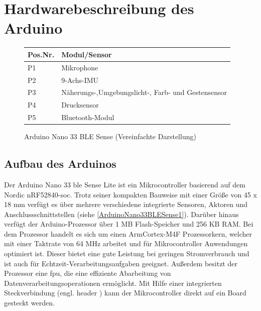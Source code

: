 %
%
%

\chapter{Hardwarebeschreibung des Arduino}
\begin{figure}[htb]
		\caption{Arduino Nano 33 BLE Sense (Vereinfachte Darstellung)} \label{ArduinoNano33BLESense1}
		\begin{tabularx}{\textwidth}{|p{1.5cm}|X|}
			\hline
			\textbf{Pos.Nr.} & \textbf{Modul/Sensor} \\
			\hline
			P1 & Mikrophone \\
			\hline
			P2 & 9-Achs-IMU \\
			\hline
			P3 & Näherungs-,Umgebungslicht-, Farb- und Gestensensor \\
			\hline
			P4 & Drucksensor \\
			\hline
			P5 & Bluetooth-Modul \\
			\hline
		\end{tabularx}
		 \label{ArduinoNano33BLESense2}
\end{figure}

\section{Aufbau des Arduinos}

Der Arduino Nano 33 \ac{ble} Sense Lite ist ein Mikrocontroller basierend auf dem Nordic nRF52840-\ac{soc}. Trotz seiner kompakten Bauweise mit einer Größe von 45 x 18 mm verfügt es über mehrere verschiedene integrierte Sensoren, Aktoren und Anschlussschnittstellen (siehe \autoref{ArduinoNano33BLESense1}). Darüber hinaus verfügt der Arduino-Prozessor über 1 MB Flash-Speicher und 256 KB RAM. Bei dem Prozessor handelt es sich um einen Arm\textregistered Cortex-M4F Prozessorkern, welcher mit einer Taktrate von 64 MHz arbeitet und für Mikrocontroller Anwendungen optimiert ist. Dieser bietet eine gute Leistung bei geringen Stromverbrauch und ist auch für Echtzeit-Verarbeitungsaufgaben geeignet. Außerdem besitzt der Prozessor eine \ac{fpu}, die eine effiziente Abarbeitung von Datenverarbeitungsoperationen ermöglicht. Mit Hilfe einer integrierten Steckverbindung (engl. \glqq header \grqq) kann der Mikrocontroller direkt auf ein Board gesteckt werden. \cite{Arm.2020} \cite{Ard.2024}

